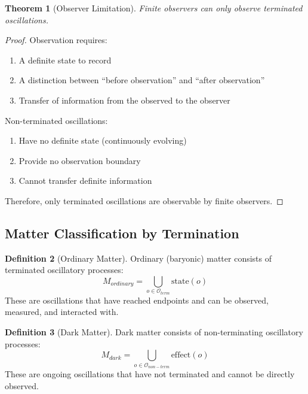 \documentclass[12pt,a4paper]{article}
\newtheorem{theorem}{Theorem}[section]
\theoremstyle{definition}
\newtheorem{definition}[theorem]{Definition}
\theoremstyle{remark}
\begin{document}
\begin{theorem}[Observer Limitation]
\label{thm:observer_limitation}
Finite observers can only observe terminated oscillations.
\end{theorem}

\begin{proof}
Observation requires:
\begin{enumerate}
    \item A definite state to record
    \item A distinction between ``before observation'' and ``after observation''
    \item Transfer of information from the observed to the observer
\end{enumerate}

Non-terminated oscillations:
\begin{enumerate}
    \item Have no definite state (continuously evolving)
    \item Provide no observation boundary
    \item Cannot transfer definite information
\end{enumerate}

Therefore, only terminated oscillations are observable by finite observers.
\end{proof}

\subsection{Matter Classification by Termination}

\begin{definition}[Ordinary Matter]
Ordinary (baryonic) matter consists of terminated oscillatory processes:
\begin{equation}
M_{ordinary} = \bigcup_{o \in \mathcal{O}_{term}} \text{state}(o)
\end{equation}
These are oscillations that have reached endpoints and can be observed, measured, and interacted with.
\end{definition}

\begin{definition}[Dark Matter]
Dark matter consists of non-terminating oscillatory processes:
\begin{equation}
M_{dark} = \bigcup_{o \in \mathcal{O}_{non-term}} \text{effect}(o)
\end{equation}
These are ongoing oscillations that have not terminated and cannot be directly observed.
\end{definition}
\end{document}
